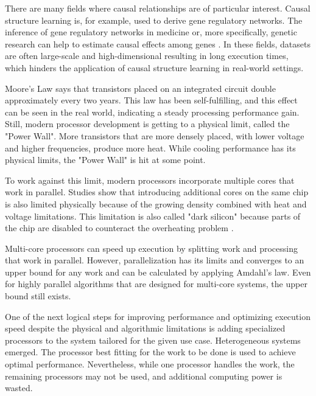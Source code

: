 There are many fields where causal relationships are of particular interest. Causal structure learning is, for example, used to derive gene regulatory networks. The inference of gene regulatory networks in medicine or, more specifically, genetic research can help to estimate causal effects among genes \cite{rauJointEstimationCausal2013}.
In these fields, datasets are often large-scale and high-dimensional resulting in long execution times, which hinders the application of causal structure learning in real-world settings.

Moore's Law \cite{mooreCrammingMoreComponents1965} says that transistors placed on an integrated circuit double approximately every two years. This law has been self-fulfilling, and this effect can be seen in the real world, indicating a steady processing performance gain. Still, modern processor development is getting to a physical limit, called the "Power Wall". More transistors that are more densely placed, with lower voltage and higher frequencies, produce more heat. While cooling performance has its physical limits, the "Power Wall" is hit at some point.

To work against this limit, modern processors incorporate multiple cores that work in parallel. Studies show that introducing additional cores on the same chip is also limited physically because of the growing density combined with heat and voltage limitations. This limitation is also called "dark silicon" because parts of the chip are disabled to counteract the overheating problem \cite{esmaeilzadehDarkSiliconEnd2011}.

Multi-core processors can speed up execution by splitting work and processing that work in parallel. However, parallelization has its limits and converges to an upper bound for any work and can be calculated by applying Amdahl's law\cite{amdahlValiditySingleProcessor1967}. Even for highly parallel algorithms that are designed for multi-core systems, the upper bound still exists.

One of the next logical steps for improving performance and optimizing execution speed despite the physical and algorithmic limitations is adding specialized processors to the system tailored for the given use case. Heterogeneous systems emerged. The processor best fitting for the work to be done is used to achieve optimal performance. Nevertheless, while one processor handles the work, the remaining processors may not be used, and additional computing power is wasted.

